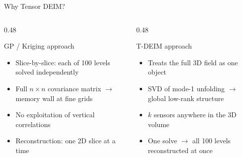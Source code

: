 \documentclass[aspectratio=169, 11pt]{beamer}
\begin{document}
\begin{frame}{Why Tensor DEIM?}
\begin{columns}[T]

\begin{column}{0.48\textwidth}
  \begingroup
  \begin{block}{GP / Kriging approach}
    \begin{itemize}\setlength\itemsep{0.3em}
      \item Slice-by-slice: each of 100 levels solved independently
      \item Full $n{\times}n$ covariance matrix $\to$ memory wall at fine grids
      \item No exploitation of vertical correlations
      \item Reconstruction: one 2D slice at a time
    \end{itemize}
  \end{block}
  \endgroup
\end{column}

\begin{column}{0.48\textwidth}
  \begingroup
  \begin{block}{T-DEIM approach}
    \begin{itemize}\setlength\itemsep{0.3em}
      \item Treats the full 3D field as one object
      \item SVD of mode-1 unfolding $\to$ global low-rank structure
      \item $k$ sensors anywhere in the 3D volume
      \item One solve $\to$ all 100 levels reconstructed at once
    \end{itemize}
  \end{block}
  \endgroup
\end{column}

\end{columns}
\end{frame}
\end{document}
